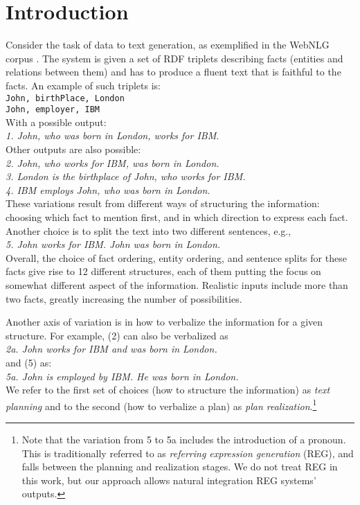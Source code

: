 \documentclass[11pt,a4paper]{article}
\begin{document}
\section{Introduction}
Consider the task of data to text generation, as exemplified in the WebNLG corpus \cite{colin2016webnlg}. The system is given a set of RDF triplets describing facts (entities and relations between them) and has to produce a fluent text that is faithful to the facts. An example of such triplets is:\\[0.5em]
\texttt{John, birthPlace, London}\\
\texttt{John, employer, IBM}\\[0.5em]
With a possible output:\\[0.5em]
\emph{\small 1. John, who was born in London, works for IBM}.\\[0.5em]
Other outputs are also possible:\\[0.5em]
\emph{\small 2. John, who works for IBM, was born in London.}\\
\emph{\small 3. London is the birthplace of John, who works for IBM.}\\
\emph{\small 4. IBM employs John, who was born in London.}\\[0.5em]
These variations result from different ways of structuring the information: choosing which fact to mention first, and in which direction to express each fact. Another choice is to split the text into two different sentences, e.g., \\[0.5em]
\emph{\small 5. John works for IBM. John was born in London.}\\[0.5em]
Overall, the choice of fact ordering, entity ordering, and sentence splits for these facts give rise to 12 different structures, each of them putting the focus on somewhat different aspect of the information. Realistic inputs include more than two facts, greatly increasing the number of possibilities.

Another axis of variation is in how to verbalize the information for a given structure. For example, (2) can also be verbalized as\\[0.5em] 
\emph{\small 2a. John works for IBM and was born in London.}\\[0.5em] and (5) as:\\[0.5em]
\emph{\small 5a. John is employed by IBM. He was born in London.}\\[0.5em]
We refer to the first set of choices (how to structure the information) as \emph{text planning} and to the second (how to verbalize a plan) as \emph{plan realization}.\footnote{Note that the variation from 5 to 5a includes the introduction of a pronoun. This is traditionally referred to as \emph{referring expression generation} (REG), and falls between the planning and realization stages. We do not treat REG in this work, but our approach allows natural integration REG systems' outputs.} 
\end{document}
